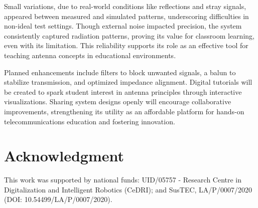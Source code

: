 \documentclass[runningheads]{llncs}
\begin{document}
Small variations, due to real-world conditions like reflections and stray signals, appeared between measured and simulated patterns, underscoring difficulties in non-ideal test settings. Though external noise impacted precision, the system consistently captured radiation patterns, proving its value for classroom learning,  even with its limitation. This reliability supports its role as an effective tool for teaching antenna concepts in educational environments.

Planned enhancements include filters to block unwanted signals, a balun to stabilize transmission, and optimized impedance alignment. Digital tutorials will be created to spark student interest in antenna principles through interactive visualizations. Sharing system designs openly will encourage collaborative improvements, strengthening its utility as an affordable platform for hands-on telecommunications education and fostering innovation.

\section*{Acknowledgment}
This work was supported by national funds: UID/05757 - Research Centre in Digitalization and Intelligent Robotics (CeDRI); and SusTEC, LA/P/0007/2020 (DOI: 10.54499/LA/P/0007/2020).




%
\end{document}
